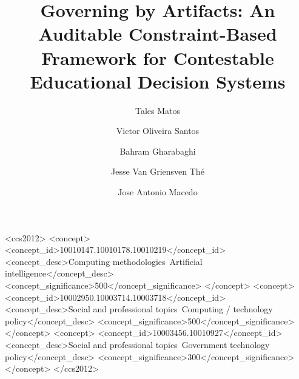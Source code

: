 \documentclass[sigconf,nonacm,balance=false]{acmart}
\begin{document}
\title{Governing by Artifacts: An Auditable Constraint-Based Framework for Contestable Educational Decision Systems}

\author{Tales Matos}

\author{Victor Oliveira Santos}

\author{Bahram Gharabaghi}

\author{Jesse Van Griensven Thé}

\author{Jose Antonio Macedo}

\renewcommand{\shortauthors}{Matos et al.}

\begin{CCSXML}
<ccs2012>
  <concept>
    <concept_id>10010147.10010178.10010219</concept_id>
    <concept_desc>Computing methodologies~Artificial intelligence</concept_desc>
    <concept_significance>500</concept_significance>
  </concept>
  <concept>
    <concept_id>10002950.10003714.10003718</concept_id>
    <concept_desc>Social and professional topics~Computing / technology policy</concept_desc>
    <concept_significance>500</concept_significance>
  </concept>
  <concept>
    <concept_id>10003456.10010927</concept_id>
    <concept_desc>Social and professional topics~Government technology policy</concept_desc>
    <concept_significance>300</concept_significance>
  </concept>
</ccs2012>
\end{CCSXML}
\end{document}

